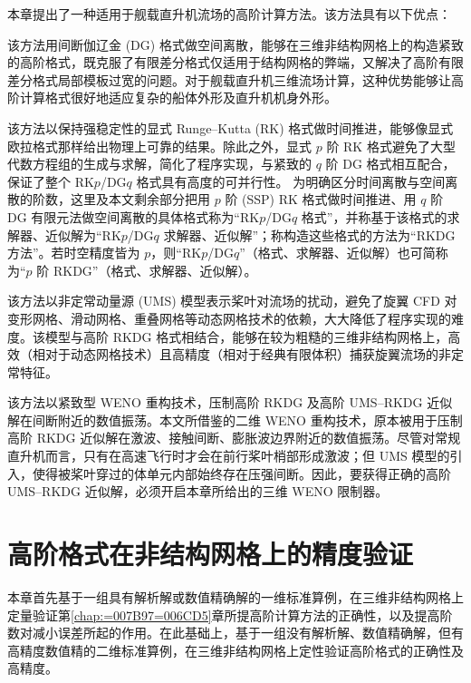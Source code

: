 本章提出了一种适用于舰载直升机流场的高阶计算方法。该方法具有以下优点：
\begin{description}[wide]
\item [{能够处理几何外形复杂的边界}] 该方法用间断伽辽金 (DG) 格式做空间离散，能够在三维非结构网格上的构造紧致的高阶格式，既克服了有限差分格式仅适用于结构网格的弊端，又解决了高阶有限差分格式局部模板过宽的问题。对于舰载直升机三维流场计算，这种优势能够让高阶计算格式很好地适应复杂的船体外形及直升机机身外形。
\item [{能够保持数值解的强稳定性}] 该方法以保持强稳定性的显式 Runge–Kutta (RK) 格式做时间推进，能够像显式欧拉格式那样给出物理上可靠的结果。除此之外，显式
$p$ 阶 RK 格式避免了大型代数方程组的生成与求解，简化了程序实现，与紧致的 $q$ 阶 DG 格式相互配合，保证了整个 RK$p$/DG$q$
格式具有高度的可并行性。
为明确区分时间离散与空间离散的阶数，这里及本文剩余部分把用 $p$ 阶 (SSP) RK 格式做时间推进、用 $q$ 阶 DG 有限元法做空间离散的具体格式称为“RK$p$/DG$q$
格式”，并称基于该格式的求解器、近似解为“RK$p$/DG$q$ 求解器、近似解”；称构造这些格式的方法为“RKDG 方法”。若时空精度皆为
$p$，则“RK$p$/DG$q$”（格式、求解器、近似解）也可简称为“$p$ 阶 RKDG”（格式、求解器、近似解）。
\item [{避免了对动态网格技术的依赖}] 该方法以非定常动量源 (UMS) 模型表示桨叶对流场的扰动，避免了旋翼 CFD 对变形网格、滑动网格、重叠网格等动态网格技术的依赖，大大降低了程序实现的难度。该模型与高阶
RKDG 格式相结合，能够在较为粗糙的三维非结构网格上，高效（相对于动态网格技术）且高精度（相对于经典有限体积）捕获旋翼流场的非定常特征。
\item [{压制了高阶近似解的数值振荡}] 该方法以紧致型 WENO 重构技术，压制高阶 RKDG 及高阶 UMS–RKDG 近似解在间断附近的数值振荡。本文所借鉴的二维
WENO 重构技术，原本被用于压制高阶 RKDG 近似解在激波、接触间断、膨胀波边界附近的数值振荡。尽管对常规直升机而言，只有在高速飞行时才会在前行桨叶梢部形成激波；但
UMS 模型的引入，使得被桨叶穿过的体单元内部始终存在压强间断。因此，要获得正确的高阶 UMS–RKDG 近似解，必须开启本章所给出的三维
WENO 限制器。
\end{description}
%

\chapter{高阶格式在非结构网格上的精度验证\label{chap:=009A8C=008BC1}}

本章首先基于一组具有解析解或数值精确解的一维标准算例，在三维非结构网格上定量验证第\ref{chap:=007B97=006CD5}章所提高阶计算方法的正确性，以及提高阶数对减小误差所起的作用。在此基础上，基于一组没有解析解、数值精确解，但有高精度数值精的二维标准算例，在三维非结构网格上定性验证高阶格式的正确性及高精度。

